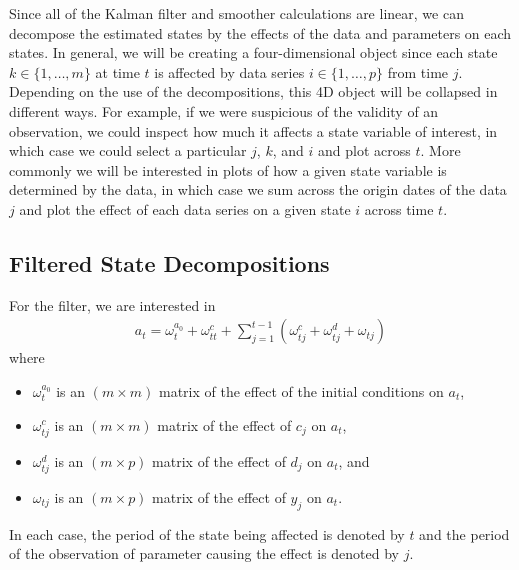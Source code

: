 \documentclass[12pt]{article}
\begin{document}
	\label{sec:state_decompositions}
	Since all of the Kalman filter and smoother calculations are linear, we can decompose the estimated states by the effects of the data and parameters on each states. In general, we will be creating a four-dimensional object since each state $k \in \{1, \dots, m\}$ at time $t$ is affected by data series $i \in \{1, \dots, p\}$ from time $j$. Depending on the use of the decompositions, this 4D object will be collapsed in different ways. For example, if we were suspicious of the validity of an observation, we could inspect how much it affects a state variable of interest, in which case we could select a particular $j$, $k$, and $i$ and plot across $t$. More commonly we will be interested in plots of how a given state variable is determined by the data, in which case we sum across the origin dates of the data $j$ and plot the effect of each data series on a given state $i$ across time $t$. 

	\subsection{Filtered State Decompositions}
	For the filter, we are interested in 
	\begin{align*}
	a_t =  \omega_t^{a_0} + \omega_{tt}^c  + \sum_{j=1}^{t-1} \left( \omega_{tj}^c + \omega_{tj}^d + \omega_{tj} \right) 
	\end{align*}
	where 
	\begin{itemize}
		\item $\omega_t^{a_0}$ is an $(m \times m)$ matrix of the effect of the initial conditions on $a_t$, 
		\item $\omega_{tj}^c$ is an $(m \times m)$ matrix of the effect of $c_j$ on $a_t$, 
		\item$\omega_{tj}^d$ is an $(m \times p)$ matrix of the effect of $d_j$ on $a_t$, and 
		\item $\omega_{tj}$ is an $(m \times p)$ matrix of the effect of $y_j$ on $a_t$. 
	\end{itemize}
	In each case, the period of the state being affected is denoted by $t$ and the period of the observation of parameter causing the effect is denoted by $j$. 
\end{document}
